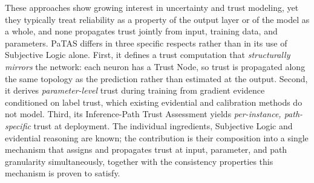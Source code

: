 These approaches show growing interest in uncertainty and trust modeling, yet they typically treat reliability as a property of the output layer or of the model as a whole, and none propagates trust jointly from input, training data, and parameters. PaTAS differs in three specific respects rather than in its use of Subjective Logic alone. First, it defines a trust computation that \emph{structurally mirrors} the network: each neuron has a Trust Node, so trust is propagated along the same topology as the prediction rather than estimated at the output. Second, it derives \emph{parameter-level} trust during training from gradient evidence conditioned on label trust, which existing evidential and calibration methods do not model. Third, its Inference-Path Trust Assessment yields \emph{per-instance, path-specific} trust at deployment. The individual ingredients, Subjective Logic and evidential reasoning are known; the contribution is their composition into a single mechanism that assigns and propagates trust at input, parameter, and path granularity simultaneously, together with the consistency properties this mechanism is proven to satisfy.